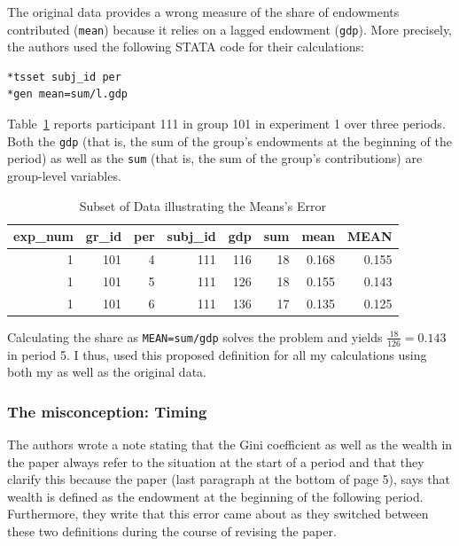 \documentclass[
  authoryear,
  preprint,
  3p]{elsarticle}
\begin{document}
The original data provides a wrong measure of the share of endowments
contributed (\texttt{mean}) because it relies on a lagged endowment
(\texttt{gdp}). More precisely, the authors used the following STATA
code for their calculations:

\begin{verbatim}
*tsset subj_id per
*gen mean=sum/l.gdp
\end{verbatim}

Table~\ref{tbl-mean-error} reports participant 111 in group 101 in
experiment 1 over three periods. Both the \texttt{gdp} (that is, the sum
of the group's endowments at the beginning of the period) as well as the
\texttt{sum} (that is, the sum of the group's contributions) are
group-level variables.

\hypertarget{tbl-mean-error}{}
\begin{table}
\caption{\label{tbl-mean-error}Subset of Data illustrating the Means's Error }\tabularnewline

\centering
\begin{tabular}{r|r|r|r|r|r|r|r}
\hline
exp\_num & gr\_id & per & subj\_id & gdp & sum & mean & MEAN\\
\hline
1 & 101 & 4 & 111 & 116 & 18 & 0.168 & 0.155\\
\hline
1 & 101 & 5 & 111 & 126 & 18 & 0.155 & 0.143\\
\hline
1 & 101 & 6 & 111 & 136 & 17 & 0.135 & 0.125\\
\hline
\end{tabular}
\end{table}

Calculating the share as \texttt{MEAN=sum/gdp} solves the problem and
yields \(\frac{18}{126}=0.143\) in period 5. I thus, used this proposed
definition for all my calculations using both my as well as the original
data.

\hypertarget{the-misconception-timing}{%
\subsubsection{The misconception:
Timing}\label{the-misconception-timing}}

The authors wrote a note stating that the Gini coefficient as well as
the wealth in the paper always refer to the situation at the start of a
period and that they clarify this because the paper (last paragraph at
the bottom of page 5), says that wealth is defined as the endowment at
the beginning of the following period. Furthermore, they write that this
error came about as they switched between these two definitions during
the course of revising the paper.
\end{document}
